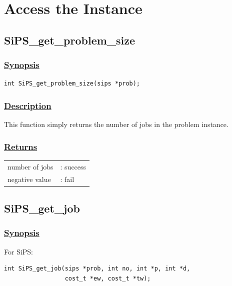 \documentclass[a4paper]{book}
\begin{document}
\section{Access the Instance}

\hypertarget{SiPS_get_problem_size}{%
\subsection{SiPS\_get\_problem\_size}
}

\subsubsection{\underline{Synopsis}}

\begin{verbatim}
int SiPS_get_problem_size(sips *prob);
\end{verbatim}

\subsubsection{\underline{Description}}

This function simply returns the number of jobs in the problem instance.

\subsubsection{\underline{Returns}}

\begin{tabular}{ll}
  number of jobs &: success\\
  negative value &: fail\\
\end{tabular}

\hypertarget{SiPS_get_job}{%
\subsection{SiPS\_get\_job}
}

\subsubsection{\underline{Synopsis}}

For SiPS:

\begin{verbatim}
int SiPS_get_job(sips *prob, int no, int *p, int *d,
                 cost_t *ew, cost_t *tw);
\end{verbatim}
\end{document}
